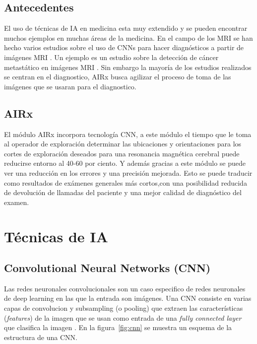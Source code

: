     \subsection{Antecedentes}
    
    El uso de técnicas de IA en medicina esta muy extendido y se pueden encontrar muchos ejemplos en muchas áreas de la medicina. En el campo
    de los MRI se han hecho varios estudios sobre el uso de CNNs para hacer diagnósticos a partir de imágenes MRI \cite{bien_dont_2018,noauthor_deep-learning_nodate}. Un ejemplo es un estudio
    sobre la detección de cáncer metastático en imágenes MRI \cite{grovik_deep_2020}.
    Sin embargo la mayoría de los estudios realizados se centran en el diagnostico, AIRx busca agilizar el proceso de toma de las imágenes
    que se usaran para el diagnostico.
    
    \subsection{AIRx}
    
    
    El módulo AIRx incorpora tecnología CNN, a este módulo el tiempo que le toma al operador de exploración determinar las ubicaciones y orientaciones para los cortes de exploración deseados para una resonancia magnética cerebral puede reducirse entorno al 40-60 por ciento. Y además gracias a este módulo se puede ver una reducción en los errores y una precisión mejorada. Esto se puede traducir como  resultados de exámenes generales más cortos,con una posibilidad reducida de devolución de llamadas del paciente y una mejor calidad de diagnóstico del examen.

\pagebreak
\section{Técnicas de IA}

    \subsection{Convolutional Neural Networks (CNN)}
    
    Las redes neuronales convolucionales son un caso especifico de redes neuronales de deep learning
    en las que la entrada son imágenes. Una CNN consiste en varias capas de convolucion y subsampling (o pooling)
    que extraen las características (\emph{features}) de la imagen que se usan como entrada de una \emph{fully connected layer}
    que clasifica la imagen \cite{saha_comprehensive_2018,noauthor_deep_nodate,noauthor_hackfromhome_nodate}.
    En la figura~\ref{fig:cnn} se muestra un esquema de la estructura de una CNN.
    
